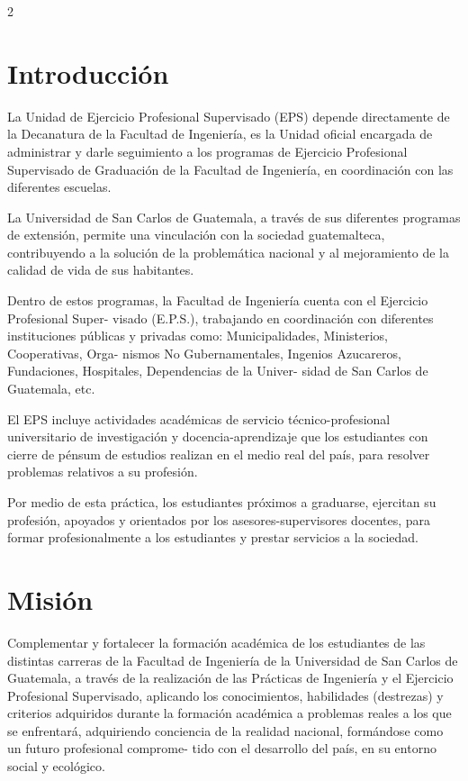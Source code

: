 \documentclass[12pt,spanish,Letterpaper,openany]{book}
\begin{document}
\begin {multicols}{2}

\hypertarget{introduccion}{%
\section*{Introducción}\label{introduccion}}

La Unidad de Ejercicio Profesional Supervisado (EPS) depende directamente de la Decanatura de la Facultad de Ingeniería, es la Unidad oficial encargada de administrar y darle seguimiento a los programas de Ejercicio Profesional Supervisado de Graduación de la Facultad de Ingeniería, en coordinación con las diferentes escuelas.

La Universidad de San Carlos de Guatemala, a través de sus diferentes programas de extensión, permite una vinculación con la sociedad guatemalteca, contribuyendo a la solución de la problemática nacional y al mejoramiento de la calidad de vida de sus habitantes.

Dentro de estos programas, la Facultad de Ingeniería cuenta con el Ejercicio Profesional Super-
visado (E.P.S.), trabajando en coordinación con diferentes instituciones públicas y privadas como: Municipalidades, Ministerios, Cooperativas, Orga-
nismos No Gubernamentales, Ingenios Azucareros, Fundaciones, Hospitales, Dependencias de la Univer-
sidad de San Carlos de Guatemala, etc.

El EPS incluye actividades académicas de servicio técnico-profesional universitario de investigación y docencia-aprendizaje que los estudiantes con cierre de pénsum de estudios realizan en el medio real del país, para resolver problemas relativos a su profesión.

Por medio de esta práctica, los estudiantes próximos a graduarse, ejercitan su profesión, apoyados y orientados por los asesores-supervisores docentes, para formar profesionalmente a los estudiantes y prestar servicios a la sociedad.

\hypertarget{mision}{%
\section*{Misión}\label{mision}}

Complementar y fortalecer la formación académica de los estudiantes de las distintas carreras de la Facultad de Ingeniería de la Universidad de San Carlos de Guatemala, a través de la realización de las Prácticas de Ingeniería y el Ejercicio Profesional Supervisado, aplicando los conocimientos, habilidades (destrezas) y criterios adquiridos durante la formación académica a problemas reales a los que se enfrentará, adquiriendo conciencia de la realidad nacional, formándose como un futuro profesional comprome-
tido con el desarrollo del país, en su entorno social y ecológico.


\end{multicols}
\end{document}
